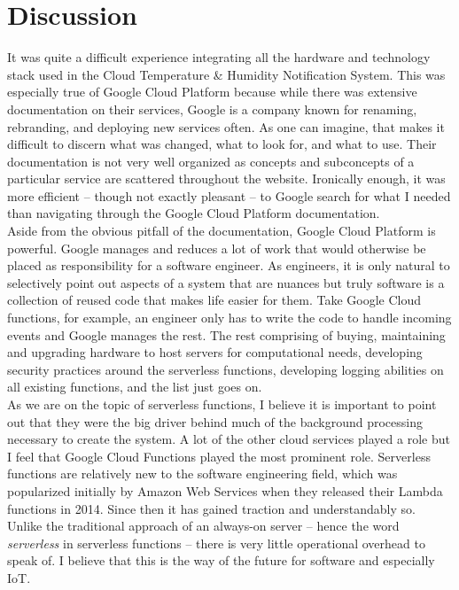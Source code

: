 \documentclass{article}
\begin{document}
\section{Discussion}
It was quite a difficult experience integrating all the hardware and technology stack used in the Cloud Temperature \& Humidity Notification System. This was especially true of Google Cloud Platform because while there was extensive documentation on their services, Google is a company known for renaming, rebranding, and deploying new services often. As one can imagine, that makes it difficult to discern what was changed, what to look for, and what to use. Their documentation is not very well organized as concepts and subconcepts of a particular service are scattered throughout the website. Ironically enough, it was more efficient -- though not exactly pleasant -- to Google search for what I needed than navigating through the Google Cloud Platform documentation.\\

Aside from the obvious pitfall of the documentation, Google Cloud Platform is powerful. Google manages and reduces a lot of work that would otherwise be placed as responsibility for a software engineer. As engineers, it is only natural to selectively point out aspects of a system that are nuances but truly software is a collection of reused code that makes life easier for them. Take Google Cloud functions, for example, an engineer only has to write the code to handle incoming events and Google manages the rest. The rest comprising of buying, maintaining and upgrading hardware to host servers for computational needs, developing security practices around the serverless functions, developing logging abilities on all existing functions, and the list just goes on.\\

As we are on the topic of serverless functions, I believe it is important to point out that they were the big driver behind much of the background processing necessary to create the system. A lot of the other cloud services played a role but I feel that Google Cloud Functions played the most prominent role. Serverless functions are relatively new to the software engineering field, which was popularized initially by Amazon Web Services when they released their Lambda functions in 2014. Since then it has gained traction and understandably so. Unlike the traditional approach of an always-on server -- hence the word \textit{serverless} in serverless functions -- there is very little operational overhead to speak of. I believe that this is the way of the future for software and especially IoT.\\
\end{document}
